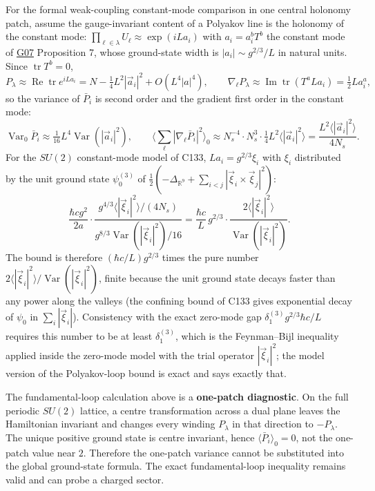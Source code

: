 \documentclass[11pt,a4paper]{article}
\begin{document}
For the formal weak-coupling constant-mode comparison in one central
holonomy patch, assume the gauge-invariant content of a Polyakov line is
the holonomy of the constant mode:
\(\prod_{\ell\in\lambda}U_\ell\approx\exp(iLa_i)\) with \(a_i=a_i^bT^b\)
the constant mode of \href{low-dimensional-mass-gap.md}{G07} Proposition
7, whose ground-state width is \(|a_i|\sim g^{2/3}/L\) in natural units.
Since \(\operatorname{tr}T^b=0\),
\[P_\lambda\approx\operatorname{Re}\operatorname{tr}e^{iLa_i}=N-\tfrac14L^2|\vec a_i|^2+O(L^4|a|^4),\qquad
\nabla_\ell P_\lambda\approx\operatorname{Im}\operatorname{tr}(T^aLa_i)=\tfrac12La_i^a ,\]
so the variance of \(\bar P_i\) is second order and the gradient first
order in the constant mode:
\[\operatorname{Var}_0\bar P_i\approx\tfrac1{16}L^4\operatorname{Var}(|\vec a_i|^2),\qquad
\Big\langle\sum_\ell|\nabla_\ell\bar P_i|^2\Big\rangle_0\approx N_s^{-4}\cdot N_s^3\cdot\tfrac14L^2\langle|\vec a_i|^2\rangle
=\frac{L^2\langle|\vec a_i|^2\rangle}{4N_s}.\] For the \(SU(2)\)
constant-mode model of C133, \(La_i=g^{2/3}\xi_i\) with \(\xi_i\)
distributed by the unit ground state \(\psi_0^{(3)}\) of
\(\tfrac12(-\Delta_{\mathbb R^9}+\sum_{i<j}|\vec\xi_i\times\vec\xi_j|^2)\):
\[\frac{\hbar cg^2}{2a}\cdot\frac{g^{4/3}\langle|\vec\xi_i|^2\rangle/(4N_s)}{g^{8/3}\operatorname{Var}(|\vec\xi_i|^2)/16}
=\frac{\hbar c}{L}\,g^{2/3}\cdot\frac{2\langle|\vec\xi_i|^2\rangle}{\operatorname{Var}(|\vec\xi_i|^2)} .\]
The bound is therefore \((\hbar c/L)g^{2/3}\) times the pure number
\(2\langle|\vec\xi_i|^2\rangle/\operatorname{Var}(|\vec\xi_i|^2)\),
finite because the unit ground state decays faster than any power along
the valleys (the confining bound of C133 gives exponential decay of
\(\psi_0\) in \(\sum_i|\vec\xi_i|\)). Consistency with the exact
zero-mode gap \(\delta_1^{(3)}g^{2/3}\hbar c/L\) requires this number to
be at least \(\delta_1^{(3)}\), which is the Feynman--Bijl inequality
applied inside the zero-mode model with the trial operator
\(|\vec\xi_i|^2\); the model version of the Polyakov-loop bound is exact
and says exactly that.

The fundamental-loop calculation above is a \textbf{one-patch
diagnostic}. On the full periodic \(SU(2)\) lattice, a centre
transformation across a dual plane leaves the Hamiltonian invariant and
changes every winding \(P_\lambda\) in that direction to \(-P_\lambda\).
The unique positive ground state is centre invariant, hence
\(\langle\bar P_i\rangle_0=0\), not the one-patch value near \(2\).
Therefore the one-patch variance cannot be substituted into the global
ground-state formula. The exact fundamental-loop inequality remains
valid and can probe a charged sector.
\end{document}
